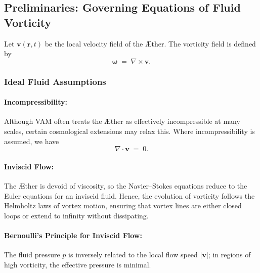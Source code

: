 \subsection{Preliminaries: Governing Equations of Fluid Vorticity}
Let \(\mathbf{v}(\mathbf{r},t)\) be the local velocity field of the Æther. The vorticity field is defined by
\[
    \boldsymbol{\omega} \;=\; \nabla \times \mathbf{v}.
\]

\subsubsection{Ideal Fluid Assumptions}
\paragraph{Incompressibility:}
Although VAM often treats the Æther as effectively incompressible at many scales, certain cosmological extensions may relax this. Where incompressibility is assumed, we have
\[
    \nabla \cdot \mathbf{v} \;=\; 0.
\]

\paragraph{Inviscid Flow:}
The Æther is devoid of viscosity, so the Navier–Stokes equations reduce to the Euler equations for an inviscid fluid. Hence, the evolution of vorticity follows the Helmholtz laws of vortex motion, ensuring that vortex lines are either closed loops or extend to infinity without dissipating.

\paragraph{Bernoulli’s Principle for Inviscid Flow:}
The fluid pressure \(p\) is inversely related to the local flow speed \(\lvert \mathbf{v} \rvert\); in regions of high vorticity, the effective pressure is minimal.

